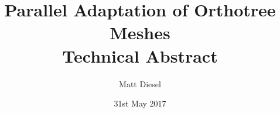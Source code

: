 \documentclass[twoside]{IIBproject}
\numberwithin{figure}{section}
\begin{document}
\date{31st May 2017}
\author{Matt Diesel}
\title{\flushright Parallel Adaptation of Orthotree Meshes \\ \Large Technical Abstract} 

\pagestyle{empty}
\maketitle



\thispagestyle{empty}
\renewcommand{\abstractname}{Technical Abstract}
\begin{abstract}
\onehalfspacing

\end{abstract}
\end{document}
